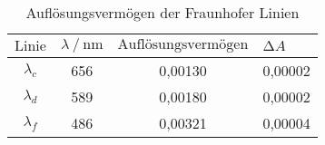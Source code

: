 \begin{table}[H]
  \centering
  \caption{Auflösungsvermögen der Fraunhofer Linien}
  \label{tab:tabe4}
    \begin{tabular}{S S S}
    \toprule
    $ \text{Linie} $ & $ \lambda \: / \: \text{nm} $ & $ \text{Auflösungsvermögen} $
    & $ \increment A $ \\
    \midrule
    $\lambda_{c}$ & 656 & 0,00130 & 0,00002 \\
    $\lambda_{d}$ & 589 & 0,00180 & 0,00002 \\
    $\lambda_{f}$ & 486 & 0,00321 & 0,00004 \\

          \bottomrule
    \end{tabular}
  \end{table}
